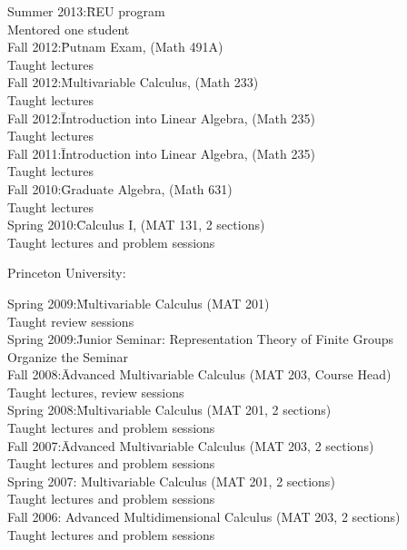 \documentclass[11pt]{amsart}
\theoremstyle{plain}
\theoremstyle{definition}
\theoremstyle{remark}
\begin{document}
\begin{tabbing}
Summer 2013:\quad\= REU program\\
\>Mentored one student \\


Fall 2012:\quad\quad\quad\= Putnam Exam, (Math 491A)\\
\>Taught lectures \\

Fall 2012:\quad\quad\quad\= Multivariable Calculus, (Math 233)\\
\>Taught lectures \\

Fall 2012:\quad\quad\quad\= Introduction into Linear Algebra, (Math 235)\\
\>Taught lectures \\

Fall 2011:\quad\quad\quad\= Introduction into Linear Algebra, (Math 235)\\
\>Taught lectures \\
Fall 2010:\quad\quad\quad\= Graduate Algebra, (Math 631)\\
\>Taught lectures \\
Spring 2010:\quad\quad\= Calculus I, (MAT 131, 2 sections)\\
 \>Taught lectures and problem sessions\\
\end{tabbing}


\noindent Princeton University:
\begin{tabbing}
Spring 2009:\quad\quad \=Multivariable Calculus (MAT
201)
\\ \>Taught  review sessions\\

Spring 2009:\quad\quad \=Junior Seminar: Representation Theory of Finite Groups
\\ \>Organize the Seminar\\



Fall 2008:\quad\quad\quad \=Advanced Multivariable Calculus (MAT
203, Course Head)
\\ \>Taught lectures, review sessions\\


Spring 2008:\quad\quad \= Multivariable Calculus (MAT
201, 2 sections)
\\ \>Taught lectures and problem sessions\\


Fall 2007:\quad\quad\quad \=Advanced Multivariable Calculus (MAT
203, 2 sections)
\\ \>Taught lectures and problem sessions\\

Spring 2007:\> Multivariable Calculus (MAT 201, 2 sections) \\
\>Taught lectures
and problem sessions\\

Fall 2006:\> Advanced Multidimensional Calculus (MAT 203, 2
sections)\\ \>Taught lectures and problem sessions \\
\end{tabbing}
\end{document}
